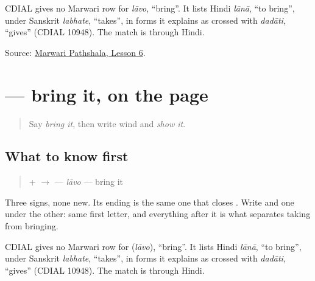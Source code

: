 \begin{cousinweb}
CDIAL gives no Marwari row for \emph{lāvo}, \textquotedblleft{}bring\textquotedblright{}. It lists Hindi \emph{lānā}, \textquotedblleft{}to bring\textquotedblright{}, under Sanskrit \emph{labhate}, \textquotedblleft{}takes\textquotedblright{}, in forms it explains as crossed with \emph{dadāti}, \textquotedblleft{}gives\textquotedblright{} (CDIAL 10948). The match is through Hindi.
\end{cousinweb}

\begin{tcolorbox}[breakable,colback=teal!4,colframe=teal!35!black,title={Before you move on}]
Source: \href{https://www.marwaripathshala.com/marwari-lesson-6-english}{Marwari Pathshala, Lesson 6}.
\end{tcolorbox}
\section[\texorpdfstring{\mw{लावो} (lāvo)}{लावो (lāvo)}]{ — bring it, on the page}

\label{lesson:MW-C25-lavo}



\begin{quote}
Say \emph{bring it}, then write wind and \emph{show it}.
\end{quote}

\subsection*{What to know first}
\begin{quote}
\textbf{} + \textbf{} $\to$ \textbf{} — \emph{lāvo} — bring it
\end{quote}

Three signs, none new. Its ending \textbf{} is the same one that closes \textbf{}. Write \textbf{} and \textbf{} one under the other: same first letter, and everything after it is what separates taking from bringing.

\begin{cousinweb}
CDIAL gives no Marwari row for \textbf{} (\emph{lāvo}), \textquotedblleft{}bring\textquotedblright{}. It lists Hindi \emph{lānā}, \textquotedblleft{}to bring\textquotedblright{}, under Sanskrit \emph{labhate}, \textquotedblleft{}takes\textquotedblright{}, in forms it explains as crossed with \emph{dadāti}, \textquotedblleft{}gives\textquotedblright{} (CDIAL 10948). The match is through Hindi.
\end{cousinweb}

